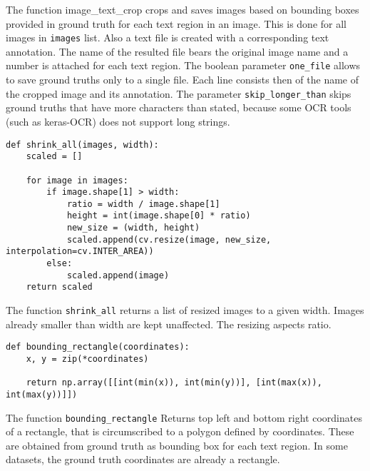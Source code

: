 The function image\_text\_crop crops and saves images based on bounding boxes provided in ground truth for each text region in an image. This is done for all images in \lstinline{images} list. Also a text file is created with a corresponding text annotation. The name of the resulted file bears the original image name and a number is attached for each text region. The boolean parameter \lstinline{one_file} allows to save ground truths only to a single file. Each line consists then of the name of the cropped image and its annotation. The parameter \lstinline{skip_longer_than} skips ground truths that have more characters than stated, because some OCR tools (such as keras-OCR) does not support long strings.

\begin{lstlisting}[caption=shrink\_all]
def shrink_all(images, width):
    scaled = []
    
    for image in images:
        if image.shape[1] > width:
            ratio = width / image.shape[1]
            height = int(image.shape[0] * ratio)
            new_size = (width, height)  
            scaled.append(cv.resize(image, new_size, interpolation=cv.INTER_AREA))
        else:
            scaled.append(image)
    return scaled    
\end{lstlisting}

The function \lstinline{shrink_all} returns a list of resized images to a given width. Images already smaller than width are kept unaffected. The resizing aspects ratio.

\begin{lstlisting}[caption=bounding\_rectangle]
def bounding_rectangle(coordinates):
    x, y = zip(*coordinates)

    return np.array([[int(min(x)), int(min(y))], [int(max(x)), int(max(y))]])
\end{lstlisting}

The function \lstinline{bounding_rectangle}
Returns top left and bottom right coordinates of a rectangle, that is circumscribed to a polygon defined by coordinates. These are obtained from ground truth as bounding box for each text region. In some datasets, the ground truth coordinates are already a rectangle.


